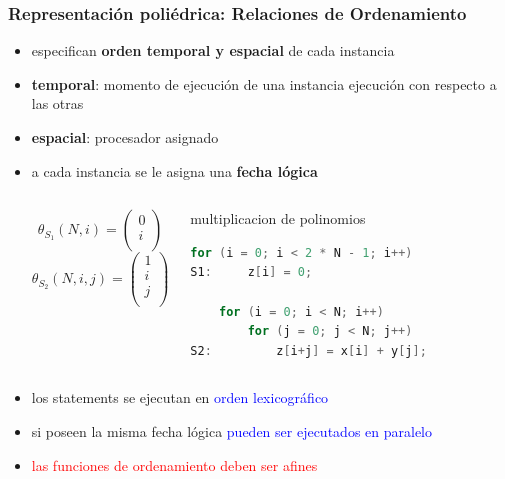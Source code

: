 \documentclass{beamer}\usetheme{Madrid} %
\begin{document}
\begin{frame}[fragile]
\frametitle{Representación poliédrica: Relaciones de Ordenamiento}
\begin{itemize}
\item especifican \textbf{orden temporal y espacial} de cada instancia
\item \textbf{temporal}: momento de ejecución de una instancia ejecución con respecto
a las otras
\item \textbf{espacial}: procesador asignado 
\item a cada instancia se le asigna una \textbf{fecha lógica}
\begin{columns}
\begin{equation}
\nonumber
\theta_{S_1}(N, i) = \left(\begin{matrix} 0 \\ i\\\end{matrix} \right)
\end{equation}
\begin{equation}
\nonumber
\theta_{S_2}(N, i, j) =  \left(\begin{matrix} 1 \\ i \\ j \\\end{matrix} \right)
\end{equation}
\begin{block}{multiplicacion de polinomios}
\begin{lstlisting}[basicstyle=\scriptsize,language=C]
    for (i = 0; i < 2 * N - 1; i++) 
S1:     z[i] = 0;
        
    for (i = 0; i < N; i++) 
        for (j = 0; j < N; j++)
S2:         z[i+j] = x[i] + y[j];
\end{lstlisting}
\end{block}
\vfill \null
\end{columns}
\item los statements se ejecutan en \textcolor{blue}{orden lexicográfico} 
\item si poseen la misma fecha lógica \textcolor{blue}{pueden ser ejecutados en paralelo}
\item \textcolor{red}{las funciones de ordenamiento deben ser afines}
\end{itemize}
\end{frame}
\end{document}
